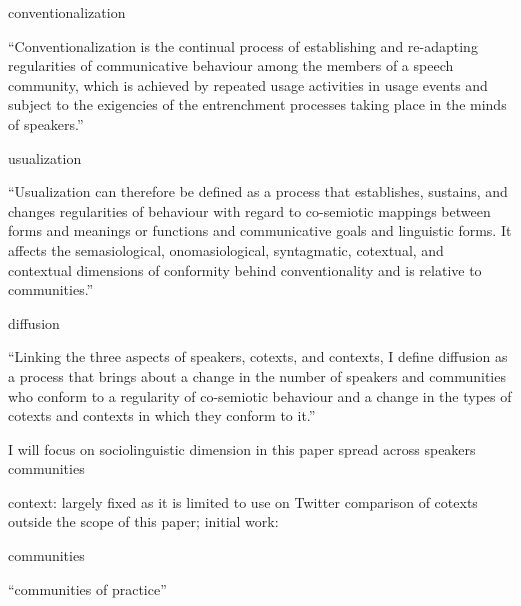 \documentclass[
  a4paper,
  abstract=on,
  captions=tableabove
  ]{scrartcl}
\begin{document}
        conventionalization

           \enquote{Conventionalization is the continual process of establishing and re-adapting regularities of communicative behaviour among the members of a speech community, which is achieved by repeated usage activities in usage events and subject to the exigencies of the entrenchment processes taking place in the minds of speakers.}~\parencite{Schmid2020DynamicsLinguistic}

        usualization

          \enquote{Usualization can therefore be defined as a process that establishes, sustains, and changes regularities of behaviour with regard to co-semiotic mappings between forms and meanings or functions and communicative goals and linguistic forms. It affects the semasiological, onomasiological, syntagmatic, cotextual, and contextual dimensions of conformity behind conventionality and is relative to communities.}~\parencite{Schmid2020DynamicsLinguistic}

        diffusion

          \enquote{Linking the three aspects of speakers, cotexts, and contexts, I define diffusion as a process that brings about a change in the number of speakers and communities who conform to a regularity of co-semiotic behaviour and a change in the types of cotexts and contexts in which they conform to it.}~\parencite{Schmid2020DynamicsLinguistic}

          I will focus on sociolinguistic dimension in this paper
            spread across
              speakers
              communities

          context: largely fixed as it is limited to use on Twitter
          comparison of cotexts outside the scope of this paper; initial work: \parencite{Schmid2020BattlingSemantica} 

        communities

          \enquote{communities of practice} \parencite{Leuckert2020ChapterDigital} 
\end{document}
